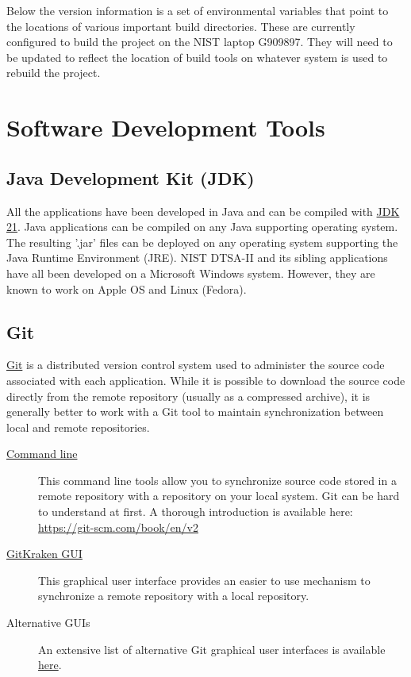 \documentclass{article}
\begin{document}
Below the version information is a set of environmental variables that point to the locations of various important build directories.  These are currently configured to build the project on the NIST laptop G909897.  They will need to be updated to reflect the location of build tools on whatever system is used to rebuild the project.

\section{Software Development Tools}
\subsection{Java Development Kit (JDK)}
All the applications have been developed in Java and can be compiled with \href{https://adoptium.net/temurin/releases/?os=windows&arch=x64&package=jdk}{JDK 21}.  Java applications can be compiled on any Java supporting operating system.  The resulting '.jar' files can be deployed on any operating system supporting the Java Runtime Environment (JRE). NIST DTSA-II and its sibling applications have all been developed on a Microsoft Windows system.  However, they are known to work on Apple OS and Linux (Fedora).

\subsection{Git}
\href{https://git-scm.com/}{Git} is a distributed version control system used to administer the source code associated with each application.  While it is possible to download the source code directly from the remote repository (usually as a compressed archive), it is generally better to work with a Git tool to maintain synchronization between local and remote repositories.
\begin{description}
    \item[\href{https://git-scm.com/}{Command line}] This command line tools allow you to synchronize source code stored in a remote repository with a repository on your local system.  Git can be hard to understand at first.  A thorough introduction is available here: \url{https://git-scm.com/book/en/v2}
    \item[\href{https://www.gitkraken.com/}{GitKraken GUI}] This graphical user interface provides an easier to use mechanism to synchronize a remote repository with a local repository.
    \item[Alternative GUIs] An extensive list of alternative Git graphical user interfaces is available  \href{https://git-scm.com/downloads/guis}{here}.
\end{description}
\end{document}
